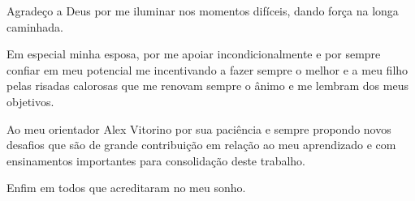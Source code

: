 \begin{agradecimentos}

Agradeço a Deus por me iluminar nos momentos difíceis, dando força na longa caminhada.

Em especial minha esposa, por me apoiar incondicionalmente e por sempre confiar em meu potencial me incentivando a fazer sempre o melhor e a meu filho pelas risadas calorosas que me renovam sempre o ânimo e me lembram dos meus objetivos.


Ao meu orientador Alex Vitorino por sua paciência e sempre propondo novos desafios que são de grande contribuição em relação ao meu aprendizado e com ensinamentos importantes para consolidação deste trabalho.




Enfim em todos que acreditaram no meu sonho.

\end{agradecimentos}

